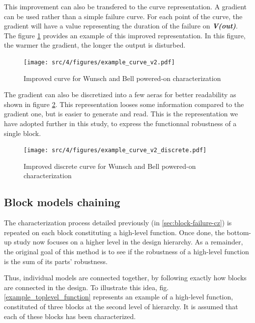This improvement can also be transfered to the curve representation.
A gradient can be used rather than a simple failure curve.
For each point of the curve, the gradient will have a value representing the duration of the failure on \textbf{\textit{V(out)}}.
The figure \ref{wb_cz_curve_example_v2} provides an example of this improved representation.
In this figure, the warmer the gradient, the longer the output is disturbed.

\begin{figure}[!htbp]
  \centering
  \texttt{[image: src/4/figures/example\_curve\_v2.pdf]}
  \caption{Improved curve for Wunsch and Bell powered-on characterization}
  \label{wb_cz_curve_example_v2}
\end{figure}

The gradient can also be discretized into a few aeras for better readability as shown in figure \ref{wb_cz_curve_example_v2_discrete}.
This representation looses some information compared to the gradient one, but is easier to generate and read.
This is the representation we have adopted further in this study, to express the functionnal robustness of a single block.

\begin{figure}[!htbp]
  \centering
  \texttt{[image: src/4/figures/example\_curve\_v2\_discrete.pdf]}
  \caption{Improved discrete curve for Wunsch and Bell powered-on characterization}
  \label{wb_cz_curve_example_v2_discrete}
\end{figure}

\subsection{Block models chaining}
\label{sec:block-chaining}

The characterization process detailed previously (in \ref{sec:block-failure-cz}) is repeated on each block constituting a high-level function.
Once done, the bottom-up study now focuses on a higher level in the design hierarchy.
As a remainder, the original goal of this method is to see if the robustness of a high-level function is the sum of its parts' robustness.

Thus, individual models are connected together, by following exactly how blocks are connected in the design.
To illustrate this idea, fig. \ref{example_toplevel_function} represents an example of a high-level function, constituted of three blocks at the second level of hierarchy.
It is assumed that each of these blocks has been characterized.

